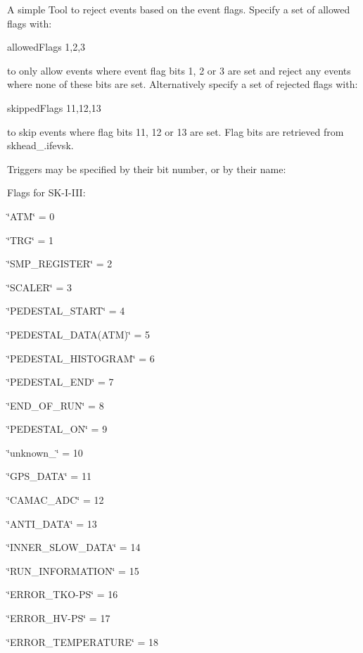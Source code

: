 A simple Tool to reject events based on the event flags. Specify a set of allowed flags with\+: \begin{DoxyVerb}allowedFlags 1,2,3
\end{DoxyVerb}
 to only allow events where event flag bits 1, 2 or 3 are set and reject any events where none of these bits are set. Alternatively specify a set of rejected flags with\+: \begin{DoxyVerb}skippedFlags 11,12,13
\end{DoxyVerb}
 to skip events where flag bits 11, 12 or 13 are set. Flag bits are retrieved from skhead\+\_\+.\+ifevsk.

Triggers may be specified by their bit number, or by their name\+:
\begin{DoxyItemize}
\item Flags for SK-\/\+I-\/\+III\+:
\item \char`\"{}\+ATM\char`\"{} = 0
\item \char`\"{}\+TRG\char`\"{} = 1
\item \char`\"{}\+SMP\+\_\+\+REGISTER\char`\"{} = 2
\item \char`\"{}\+SCALER\char`\"{} = 3
\item \char`\"{}\+PEDESTAL\+\_\+\+START\char`\"{} = 4
\item \char`\"{}\+PEDESTAL\+\_\+\+DATA(\+ATM)\char`\"{} = 5
\item \char`\"{}\+PEDESTAL\+\_\+\+HISTOGRAM\char`\"{} = 6
\item \char`\"{}\+PEDESTAL\+\_\+\+END\char`\"{} = 7
\item \char`\"{}\+END\+\_\+\+OF\+\_\+\+RUN\char`\"{} = 8
\item \char`\"{}\+PEDESTAL\+\_\+\+ON\char`\"{} = 9
\item \char`\"{}unknown\+\_\char`\"{} = 10
\item \char`\"{}\+GPS\+\_\+\+DATA\char`\"{} = 11
\item \char`\"{}\+CAMAC\+\_\+\+ADC\char`\"{} = 12
\item \char`\"{}\+ANTI\+\_\+\+DATA\char`\"{} = 13
\item \char`\"{}\+INNER\+\_\+\+SLOW\+\_\+\+DATA\char`\"{} = 14
\item \char`\"{}\+RUN\+\_\+\+INFORMATION\char`\"{} = 15
\item \char`\"{}\+ERROR\+\_\+\+TKO-\/\+PS\char`\"{} = 16
\item \char`\"{}\+ERROR\+\_\+\+HV-\/\+PS\char`\"{} = 17
\item \char`\"{}\+ERROR\+\_\+\+TEMPERATURE\char`\"{} = 18

\end{DoxyItemize}

